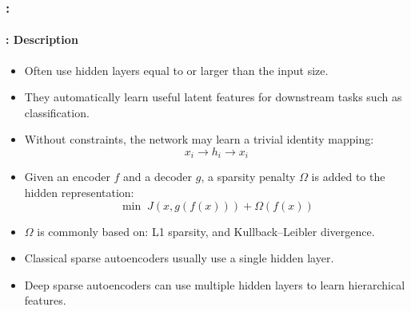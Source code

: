 \documentclass[xcolor=table]{beamer}
\begin{document}
	\begin{frame}
		\frametitle{\insertshortsubtitle: \insertsection}
		\framesubtitle{\insertsubsection: Description}
		
		\begin{itemize}
			\item Often use hidden layers equal to or larger than the input size.
			
			\item They automatically learn useful latent features for downstream tasks such as classification.
			
			\item Without constraints, the network may learn a trivial identity mapping:
			\[
			x_i \rightarrow h_i \rightarrow x_i
			\]
			
			\item Given an encoder $f$ and a decoder $g$, a sparsity penalty $\Omega$ is added to the hidden representation:
			\[
			\min \; J(x, g(f(x))) + \Omega(f(x))
			\]
			
			\item $\Omega$ is commonly based on: L1 sparsity, and Kullback--Leibler divergence.
			
			\item Classical sparse autoencoders usually use a single hidden layer.
			
			\item Deep sparse autoencoders can use multiple hidden layers to learn hierarchical features.
			
		\end{itemize}
		
	\end{frame}
	
\end{document}
